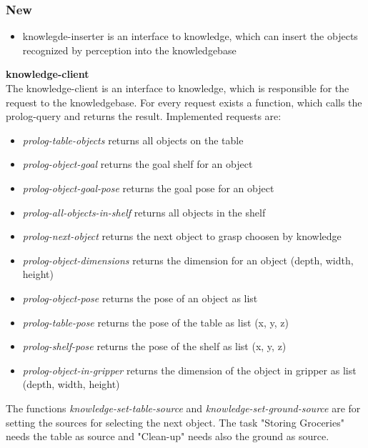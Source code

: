 \documentclass[main.tex]{subfiles}
\begin{document}
                \subsubsection{New}
                \begin{itemize}
 				          \item knowlegde-inserter is an interface to knowledge, which can insert the objects recognized by perception into the knowledgebase
				        \end{itemize}
				          \textbf{knowledge-client} \\
				          The knowledge-client is an interface to knowledge, which is responsible for the request to the knowledgebase. For every request exists a function, which calls the prolog-query and returns the result. Implemented requests are:
				          \begin{itemize}
				             \item \textit{prolog-table-objects} returns all objects on the table
				             \item \textit{prolog-object-goal} returns the goal shelf for an object
				             \item \textit{prolog-object-goal-pose} returns the goal pose for an object
				             \item \textit{prolog-all-objects-in-shelf} returns all objects in the shelf
				             \item \textit{prolog-next-object} returns the next object to grasp choosen by knowledge
				             \item \textit{prolog-object-dimensions} returns the dimension for an object (depth, width, height)
				             \item \textit{prolog-object-pose} returns the pose of an object as list
				             \item \textit{prolog-table-pose} returns the pose of the table as list (x, y, z)
				             \item \textit{prolog-shelf-pose} returns the pose of the shelf as list (x, y, z)
				             \item \textit{prolog-object-in-gripper} returns the dimension of the object in gripper as list (depth, width, height)
				           \end{itemize} 
				            The functions \textit{knowledge-set-table-source} and \textit{knowledge-set-ground-source} are for setting the sources for selecting the next object. The task "Storing Groceries" needs the table as source and "Clean-up" needs also the ground as source. 
				        
\end{document}
